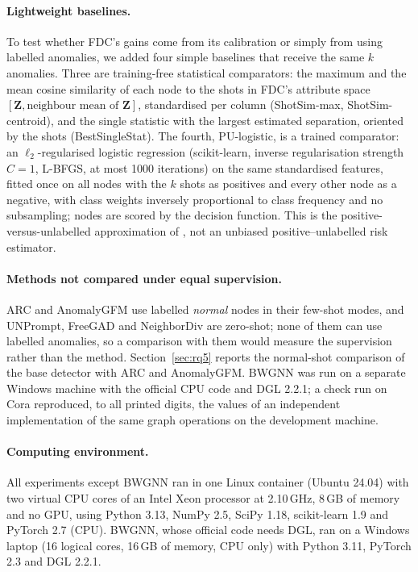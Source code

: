 \documentclass[pdflatex,sn-mathphys-ay]{sn-jnl}
\theoremstyle{plain}
\theoremstyle{remark}
\begin{document}
\paragraph{Lightweight baselines.} To test whether FDC's gains come from its calibration or simply from using labelled anomalies, we added four simple baselines that receive the same $k$ anomalies. Three are training-free statistical comparators: the maximum and the mean cosine similarity of each node to the shots in FDC's attribute space $[\mathbf{Z}, \text{neighbour mean of }\mathbf{Z}]$, standardised per column (ShotSim-max, ShotSim-centroid), and the single statistic with the largest estimated separation, oriented by the shots (BestSingleStat). The fourth, PU-logistic, is a trained comparator: an $\ell_2$-regularised logistic regression (scikit-learn, inverse regularisation strength $C=1$, L-BFGS, at most 1000 iterations) on the same standardised features, fitted once on all nodes with the $k$ shots as positives and every other node as a negative, with class weights inversely proportional to class frequency and no subsampling; nodes are scored by the decision function. This is the positive-versus-unlabelled approximation of \citet{elkan2008learning}, not an unbiased positive--unlabelled risk estimator.

\paragraph{Methods not compared under equal supervision.} ARC and AnomalyGFM use labelled \emph{normal} nodes in their few-shot modes, and UNPrompt, FreeGAD and NeighborDiv are zero-shot; none of them can use labelled anomalies, so a comparison with them would measure the supervision rather than the method. Section~\ref{sec:rq5} reports the normal-shot comparison of the base detector with ARC and AnomalyGFM. BWGNN was run on a separate Windows machine with the official CPU code and DGL 2.2.1; a check run on Cora reproduced, to all printed digits, the values of an independent implementation of the same graph operations on the development machine.

\paragraph{Computing environment.} All experiments except BWGNN ran in one Linux container (Ubuntu 24.04) with two virtual CPU cores of an Intel Xeon processor at 2.10\,GHz, 8\,GB of memory and no GPU, using Python 3.13, NumPy 2.5, SciPy 1.18, scikit-learn 1.9 and PyTorch 2.7 (CPU). BWGNN, whose official code needs DGL, ran on a Windows laptop (16 logical cores, 16\,GB of memory, CPU only) with Python 3.11, PyTorch 2.3 and DGL 2.2.1.
\end{document}

